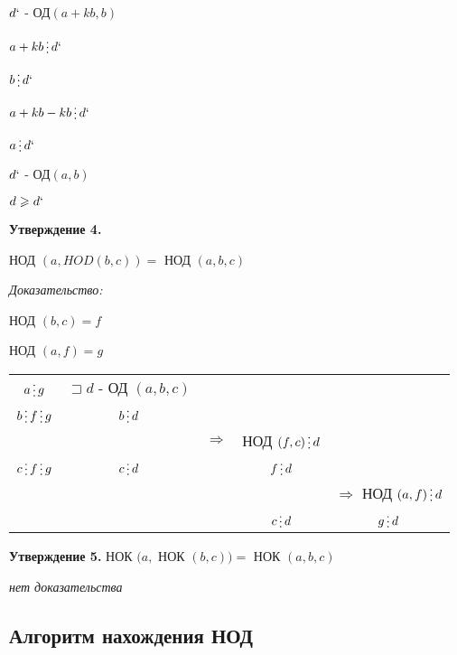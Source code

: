\documentclass[12pt]{article}
\begin{document}
\begin{enumerate}
        $d`$ - ОД$(a+kb,b)$\par
        $a+kb \mathop{\raisebox{-2pt}{\vdots}} d`$\par
        $b \mathop{\raisebox{-2pt}{\vdots}} d`$\par
        $a +kb-kb \mathop{\raisebox{-2pt}{\vdots}} d`$\par
        $a \mathop{\raisebox{-2pt}{\vdots}} d`$\par
        $d`$ - ОД$(a,b)$\par
        $d \geqslant d`$\par
    \end{enumerate}\par
    
    \textbf{Утверждение 4.}\par
    НОД $(a, HOD(b,c)) =$ НОД $(a,b,c)$\par
    \textit{Доказательство:}\par
    НОД $(b,c) = f$\par
    НОД $(a,f) = g$\par
    \begin{tabular}{ccccc}
        $a \mathop{\raisebox{-2pt}{\vdots}} g$ & $\sqsupset d$ - ОД $(a,b,c)$ \\
        $b \mathop{\raisebox{-2pt}{\vdots}} f \mathop{\raisebox{-2pt}{\vdots}} g$ & $b \mathop{\raisebox{-2pt}{\vdots}} d$\\
        & & $\Rightarrow$ & НОД $(f,c) \mathop{\raisebox{-2pt}{\vdots}} d$ \\
        $c \mathop{\raisebox{-2pt}{\vdots}} f \mathop{\raisebox{-2pt}{\vdots}} g$ & $c \mathop{\raisebox{-2pt}{\vdots}} d$
        & & $f \mathop{\raisebox{-2pt}{\vdots}} d$ \\
        & & & & $\Rightarrow$ НОД $(a,f) \mathop{\raisebox{-2pt}{\vdots}} d$\\
        & & & $c \mathop{\raisebox{-2pt}{\vdots}} d$ & $g \mathop{\raisebox{-2pt}{\vdots}} d$\\
    \end{tabular}\par
    
    \textbf{Утверждение 5.} НОК $(a,$ НОК $(b,c))=$ НОК $(a,b,c)$\par
    \textit{нет доказательства}\par
    \subsection{Алгоритм нахождения НОД}\par
\end{document}
